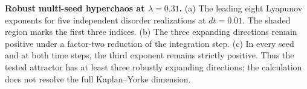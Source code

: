 \textbf{Robust multi-seed hyperchaos at $\lambda=0.31$.} (a) The leading eight Lyapunov exponents for five independent disorder realizations at $dt=0.01$.  The shaded region marks the first three indices.  (b) The three expanding directions remain positive under a factor-two reduction of the integration step. (c) In every seed and at both time steps, the third exponent remains strictly positive.  Thus the tested attractor has at least three robustly expanding directions; the calculation does not resolve the full Kaplan--Yorke dimension.
